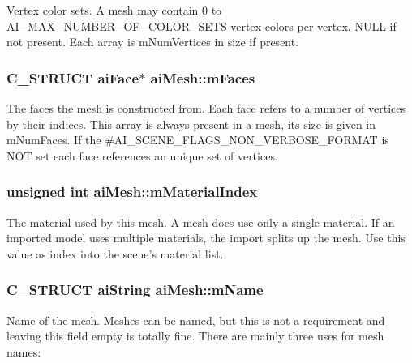 \-Vertex color sets. \-A mesh may contain 0 to \hyperlink{mesh_8h_a74ea1282873ac4b111b48d2380c26bdc}{\-A\-I\-\_\-\-M\-A\-X\-\_\-\-N\-U\-M\-B\-E\-R\-\_\-\-O\-F\-\_\-\-C\-O\-L\-O\-R\-\_\-\-S\-E\-T\-S} vertex colors per vertex. \-N\-U\-L\-L if not present. \-Each array is m\-Num\-Vertices in size if present. \hypertarget{structaiMesh_a5a65fbc7fdea7f8d36f39047425ece07}{
\subsubsection[{m\-Faces}]{\setlength{\rightskip}{0pt plus 5cm}\-C\-\_\-\-S\-T\-R\-U\-C\-T {\bf ai\-Face}$\ast$ {\bf ai\-Mesh\-::m\-Faces}}}\label{structaiMesh_a5a65fbc7fdea7f8d36f39047425ece07}
\-The faces the mesh is constructed from. \-Each face refers to a number of vertices by their indices. \-This array is always present in a mesh, its size is given in m\-Num\-Faces. \-If the \#\-A\-I\-\_\-\-S\-C\-E\-N\-E\-\_\-\-F\-L\-A\-G\-S\-\_\-\-N\-O\-N\-\_\-\-V\-E\-R\-B\-O\-S\-E\-\_\-\-F\-O\-R\-M\-A\-T is \-N\-O\-T set each face references an unique set of vertices. \hypertarget{structaiMesh_aa2807c7ba172115203ed16047ad65f9e}{
\subsubsection[{m\-Material\-Index}]{\setlength{\rightskip}{0pt plus 5cm}unsigned int {\bf ai\-Mesh\-::m\-Material\-Index}}}\label{structaiMesh_aa2807c7ba172115203ed16047ad65f9e}
\-The material used by this mesh. \-A mesh does use only a single material. \-If an imported model uses multiple materials, the import splits up the mesh. \-Use this value as index into the scene's material list. \hypertarget{structaiMesh_a8dd9433e0c5b008e3e5aee6c801d3b74}{
\subsubsection[{m\-Name}]{\setlength{\rightskip}{0pt plus 5cm}\-C\-\_\-\-S\-T\-R\-U\-C\-T {\bf ai\-String} {\bf ai\-Mesh\-::m\-Name}}}\label{structaiMesh_a8dd9433e0c5b008e3e5aee6c801d3b74}
\-Name of the mesh. \-Meshes can be named, but this is not a requirement and leaving this field empty is totally fine. \-There are mainly three uses for mesh names\-:
